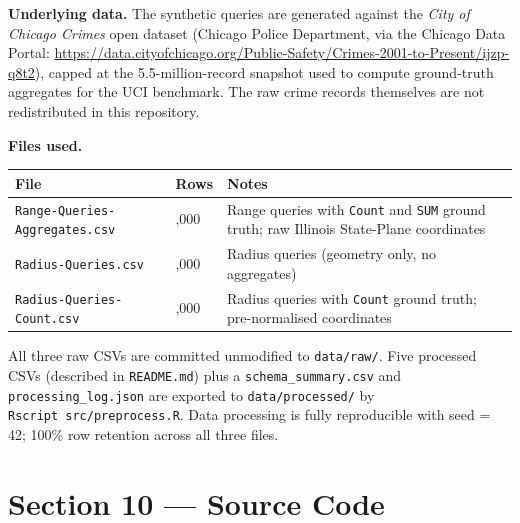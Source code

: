 \documentclass[
  10pt,
  twocolumn,
  10pt]{article}
\newcounter{none} %
\begin{document}
\textbf{Underlying data.} The synthetic queries are generated against
the \emph{City of Chicago Crimes} open dataset (Chicago Police
Department, via the Chicago Data Portal:
\url{https://data.cityofchicago.org/Public-Safety/Crimes-2001-to-Present/ijzp-q8t2}),
capped at the 5.5-million-record snapshot used to compute ground-truth
aggregates for the UCI benchmark. The raw crime records themselves are
not redistributed in this repository.

\textbf{Files used.}

{\def\LTcaptype{none} %
\begin{longtable}[]{@{}
  >{\raggedright\arraybackslash}p{}
  >{\raggedright\arraybackslash}p{}
  >{\raggedright\arraybackslash}p{}@{}}
\toprule\noalign{}
\begin{minipage}[b]{\linewidth}\raggedright
File
\end{minipage} & \begin{minipage}[b]{\linewidth}\raggedright
Rows
\end{minipage} & \begin{minipage}[b]{\linewidth}\raggedright
Notes
\end{minipage} \\
\midrule\noalign{}
\endhead
\bottomrule\noalign{}
\endlastfoot
\texttt{Range-Queries-Aggregates.csv} & 200,000 & Range queries with
\texttt{Count} and \texttt{SUM} ground truth; raw Illinois State-Plane
coordinates \\
\texttt{Radius-Queries.csv} & 50,000 & Radius queries (geometry only, no
aggregates) \\
\texttt{Radius-Queries-Count.csv} & 10,000 & Radius queries with
\texttt{Count} ground truth; pre-normalised coordinates \\
\end{longtable}
}

All three raw CSVs are committed unmodified to \texttt{data/raw/}. Five
processed CSVs (described in \texttt{README.md}) plus a
\texttt{schema\_summary.csv} and \texttt{processing\_log.json} are
exported to \texttt{data/processed/} by
\texttt{Rscript\ src/preprocess.R}. Data processing is fully
reproducible with seed = 42; 100\% row retention across all three files.

\section{Section 10 --- Source Code}\label{section-10-source-code}
\end{document}
